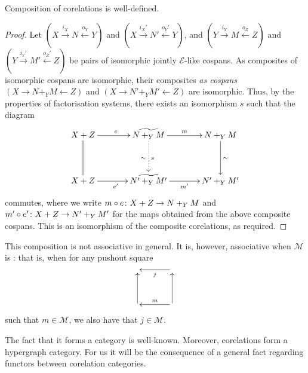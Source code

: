 \begin{proposition}
  Composition of corelations is well-defined.
\end{proposition}
\begin{proof}
  Let
    $(X \stackrel{i_X}{\longrightarrow} N \stackrel{o_Y}{\longleftarrow} Y)$ and 
    $(X \stackrel{i_X'}{\longrightarrow} N' \stackrel{o_Y'}{\longleftarrow} Y)$,
  and
    $(Y \stackrel{i_Y}{\longrightarrow} M \stackrel{o_Z}{\longleftarrow} Z)$ and 
    $(Y \stackrel{i_Y'}{\longrightarrow} M' \stackrel{o_Z'}{\longleftarrow} Z)$
  be pairs of isomorphic jointly $\mathcal E$-like cospans. As composites
  of isomorphic cospans are isomorphic, their composites \emph{as cospans}
    $(X \longrightarrow N+_YM \longleftarrow Z)$ and 
    $(X \longrightarrow N'+_YM' \longleftarrow Z)$
  are isomorphic. Thus, by the properties of factorisation systems, there exists
  an isomorphism $s$ such that the diagram
  \[
    \xymatrixcolsep{3pc}
    \xymatrixrowsep{3pc}
    \xymatrix{
      X+Z \ar[r]^e \ar@{=}[d] & \widetilde{N+_YM} \ar[r]^m \ar@{.>}[d]^{s}_\sim & N+_YM
      \ar[d]^\sim \\
      X+Z \ar[r]_{e'}&\widetilde{N'+_YM'} \ar[r]_{m'} & N'+_YM'
    }
  \]
  commutes, where we write $m\circ e{\colon} X+Z \to N+_YM$ and $m'\circ e'{\colon}
  X+Z \to N'+_YM'$ for the maps obtained from the above composite cospans. This
  is an isomorphism of the composite corelations, as required.
\end{proof}

This composition is not associative in general. It is, however, associative when
$\mathcal M$ is : that is, when for any pushout square
  \[
    \xymatrixcolsep{3pc}
    \xymatrixrowsep{3pc}
    \xymatrix{
      & \ar[l]^j \\
      \ar[u] &  \ar[u] \ar[l]_m 
    }
  \]
such that $m \in \mathcal M$, we also have that $j \in \mathcal M$. 

The fact that it forms a category is well-known. Moreover, corelations form a
hypergraph category. For us it will be the consequence of a general fact
regarding functors between corelation categories.


